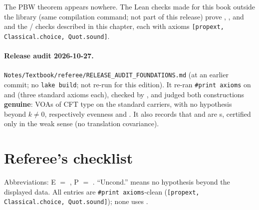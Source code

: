 The PBW theorem  appears nowhere. The Lean checks made for this book outside the library
(same compilation command; not part of this release) prove ,
,  and  and the /
checks described in this chapter, each with axioms \texttt{[propext, Classical.choice, Quot.sound]}.

\paragraph{Release audit 2026-10-27.} \texttt{Notes/\allowbreak Textbook/\allowbreak referee/\allowbreak RELEASE\_AUDIT\_FOUNDATIONS.md}
(at an earlier commit; no \texttt{lake build}; not re-run for this edition). It re-ran \texttt{\#print axioms} on  and
 (three standard axioms each), checked  by , and
judged both constructions \textbf{genuine}: VOAs of CFT type on the standard carriers, with no hypothesis beyond $k\ne0$,
respectively evenness and . It also records that  and  are s,
certified only in the weak sense (no translation covariance).

\section{Referee's checklist}\label{l05:sec:checklist}

Abbreviations: E $=$ , P $=$ . ``Uncond.'' means no hypothesis beyond the displayed data. All
entries are \texttt{\#print axioms}-clean (\texttt{[propext, Classical.choice, Quot.sound]}); none uses .

